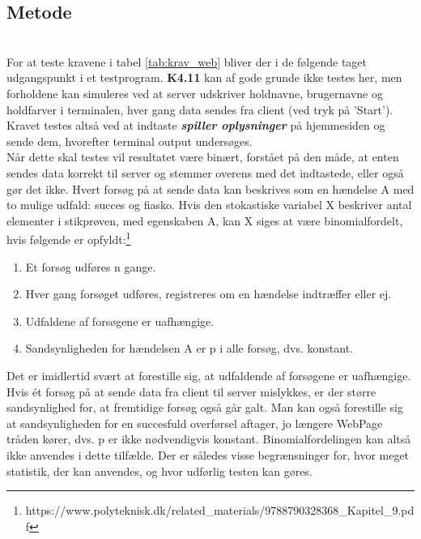 \documentclass[Modultest/Modultest_main.tex]{subfiles}
\begin{document}
\subsection{Metode}
\\For at teste kravene i tabel \ref{tab:krav_web} bliver der i de følgende taget udgangspunkt i et testprogram. \textbf{K4.11} kan af gode grunde ikke testes her, men forholdene kan simuleres ved at server udskriver holdnavne, brugernavne og holdfarver i terminalen, hver gang data sendes fra client (ved tryk på 'Start'). Kravet testes altså ved at indtaste \textit{\textbf{spiller oplysninger}} på hjemmesiden og sende dem, hvorefter terminal output undersøges.
\\Når dette skal testes vil resultatet være binært, forstået på den måde, at enten sendes data korrekt til server og stemmer overens med det indtastede, eller også gør det ikke. Hvert forsøg på at sende data kan beskrives som en hændelse A med to mulige udfald: succes og fiasko.
Hvis den stokastiske variabel X beskriver antal elementer i stikprøven, med egenskaben A, kan X siges at være binomialfordelt, hvis følgende er opfyldt:\footnote{https://www.polyteknisk.dk/related\_materials/9788790328368\_Kapitel\_9.pdf}
\begin{enumerate}
    \item Et forsøg udføres n gange.
    \item Hver gang forsøget udføres, registreres om en hændelse indtræffer eller ej.
    \item Udfaldene af forsøgene er uafhængige.
    \item Sandsynligheden for hændelsen A er p i alle forsøg, dvs. konstant.
\end{enumerate}
Det er imidlertid svært at forestille sig, at udfaldende af forsøgene er uafhængige. Hvis ét forsøg på at sende data fra client til server mislykkes, er der større sandsynlighed for, at
fremtidige forsøg også går galt. Man kan også forestille sig at sandsynligheden for en succesfuld overførsel aftager, jo længere WebPage tråden kører, dvs. p er ikke nødvendigvis konstant. Binomialfordelingen kan altså ikke anvendes i dette tilfælde. Der er således visse begrænsninger for, hvor meget statistik, der kan anvendes, og hvor udførlig testen kan gøres. \\
\newpage
\end{document}
